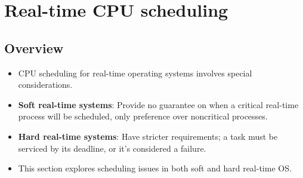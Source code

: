 \section{Real-time CPU scheduling}\label{sec:5.6}

\subsection{Overview}
\begin{itemize}
    \item CPU scheduling for real-time operating systems involves special considerations.
    \item \textbf{Soft real-time systems}: Provide no guarantee on when a critical real-time process will be scheduled, only preference over noncritical processes.
    \item \textbf{Hard real-time systems}: Have stricter requirements; a task must be serviced by its deadline, or it's considered a failure.
    \item This section explores scheduling issues in both soft and hard real-time OS.
\end{itemize}

